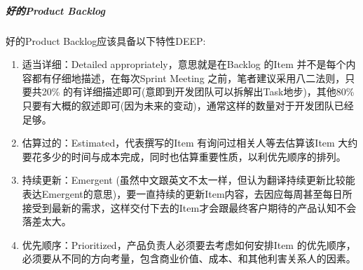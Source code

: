 \documentclass[letterpaper,11pt,english]{sphinxmanual}
\begin{document}
\subparagraph{好的Product Backlog}
\label{\detokenize{chapter_project/Scrum:product-backlog}}
好的Product Backlog应该具备以下特性DEEP:
%
\begin{footnote}[740]\sphinxAtStartFootnote
{}
%
\end{footnote}
\begin{enumerate}
%
\item {} 
适当详细：Detailed appropriately，意思就是在Backlog 的Item
并不是每个内容都有仔细地描述，在每次Sprint Meeting
之前，笔者建议采用八二法则，只要共20\%
的有详细描述即可(意即到开发团队可以拆解出Task地步)，其他80\%
只要有大概的叙述即可(因为未来的变动)，通常这样的数量对于开发团队已经足够。

\item {} 
估算过的：Estimated，代表撰写的Item 有询问过相关人等去估算该Item
大约要花多少的时间与成本完成，同时也估算重要性质，以利优先顺序的排列。

\item {} 
持续更新：Emergent
(虽然中文跟英文不太一样，但认为翻译持续更新比较能表达Emergent的意思)，要一直持续的更新Item内容，去因应每周甚至每日所接受到最新的需求，这样交付下去的Item才会跟最终客户期待的产品认知不会落差太大。

\item {} 
优先顺序：Prioritized，产品负责人必须要去考虑如何安排Item
的优先顺序，必须要从不同的方向考量，包含商业价值、成本、和其他利害关系人的因素。

\end{enumerate}
\end{document}
